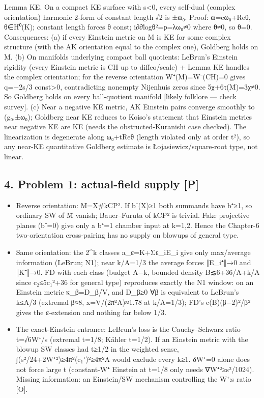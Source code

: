 \documentclass[
  10pt,
]{report}
\providecommand{\tightlist}{%
  \setlength{\itemsep}{0pt}\setlength{\parskip}{0pt}}
\begin{document}
Lemma KE. On a compact KE surface with s\textless0, every self-dual
(complex orientation) harmonic 2-form of constant length √2 is ±ω₀.
Proof: ω=cω₀+Reθ, θ∈H⁰(K); constant length forces \textbar θ\textbar{}
const; i∂∂̄log\textbar θ\textbar²=ρ=λω₀≠0 where θ≠0, so θ=0.
Consequences: (a) if every Einstein metric on M is KE for some complex
structure (with the AK orientation equal to the complex one), Goldberg
holds on M. (b) On manifolds underlying compact ball quotients: LeBrun's
Einstein rigidity (every Einstein metric is CH up to diffeo/scale) +
Lemma KE handles the complex orientation; for the reverse orientation
W⁺(M̄)=W⁻(CH)=0 gives q=−2s/3 const\textgreater0, contradicting nonempty
Nijenhuis zeros since 5χ+6τ(M̄)=3χ≠0. So Goldberg holds on every
ball-quotient manifold {[}likely folklore --- check survey{]}. (c) Near
a negative KE metric, AK Einstein pairs converge smoothly to (g₀,±ω₀);
Goldberg near KE reduces to Koiso's statement that Einstein metrics near
negative KE are KE (needs the obstructed-Kuranishi case checked). The
linearization is degenerate along ω₀+tReθ (length violated only at order
t²), so any near-KE quantitative Goldberg estimate is
Łojasiewicz/square-root type, not linear.

\hypertarget{problem-1-actual-field-supply-p}{%
\subsection{4. Problem 1: actual-field supply
{[}P{]}}\label{problem-1-actual-field-supply-p}}

\begin{itemize}
\tightlist
\item
  Reverse orientation: M̄=X̄\#kCP². If b⁻(X)≥1 both summands have b⁺≥1, so
  ordinary SW of M̄ vanish; Bauer--Furuta of kCP² is trivial. Fake
  projective planes (b⁻=0) give only a b⁺=1 chamber input at k=1,2.
  Hence the Chapter-6 two-orientation cross-pairing has no supply on
  blowups of general type.
\item
  Same orientation: the 2\^{}k classes a\_ε=K+Σε\_iE\_i give only
  max/average information (LeBrun; N1); near k/A=1/3 the average forces
  ‖E\_i⁺‖→0 and ‖K⁻‖→0. FD with each class (budget A−k, bounded density
  B≲6+36/A+k/A since c₂≤5c₁²+36 for general type) reproduces exactly the
  N1 window: on an Einstein metric κ\_β=D\_β/V, and D\_β≥0 ∀β is
  equivalent to LeBrun's k≤A/3 (extremal β≈8, x=V/(2π²A)≈1.78 at
  k/A=1/3); FD's c(B)(β−2)²/β² gives the ε-extension and nothing far
  below 1/3.
\item
  The exact-Einstein entrance: LeBrun's loss is the Cauchy--Schwarz
  ratio t=√6\textbar W⁺\textbar/\textbar s\textbar{} (extremal t=1/8;
  Kähler t=1/2). If an Einstein metric with the blowup SW classes had
  t≥1/2 in the weighted sense,
  ∫(s²/24+2\textbar W⁺\textbar²)≥4π²(c₁⁺)²≥4π²A would exclude every k≥1.
  δW⁺=0 alone does not force large t (constant-\textbar W⁺\textbar{}
  Einstein at t=1/8 only needs
  \textbar∇W⁺\textbar²≥\textbar s\textbar³/1024). Missing information:
  an Einstein/SW mechanism controlling the
  \textbar W⁺\textbar:\textbar s\textbar{} ratio {[}O{]}.
\end{itemize}
\end{document}
